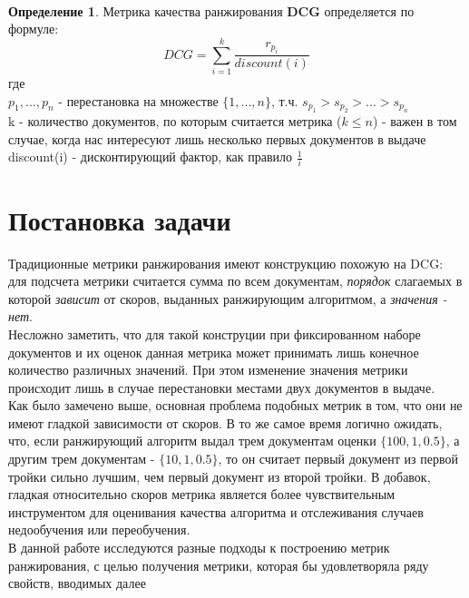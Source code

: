 \documentclass[14pt,a4paper]{amsart}
\theoremstyle{definition}
\newtheorem{definition}{Определение}[section]
\theoremstyle{definition}
\newcommand{\Sum}{\sum\limits}
\renewcommand\i{\textit}
\renewcommand\b{\textbf}
\begin{document}
~\\

\begin{definition}
Метрика качества ранжирования \b{DCG} определяется по формуле:
$$DCG = \Sum_{i=1}^k \frac{r_{p_i}}{discount(i)}$$
где \\
$p_1,...,p_n$ - перестановка на множестве $\{1,...,n\}$, т.ч. ${s_{p_1} > s_{p_2} > ... > s_{p_n}}$ \\
k - количество документов, по которым считается метрика ($k \le n$) - важен в том случае, когда нас интересуют лишь несколько первых документов в выдаче \\
discount(i) - дисконтирующий фактор, как правило $\frac{1}{i}$ \\
\end{definition}

\newpage
\section{Постановка задачи}

Традиционные метрики ранжирования имеют конструкцию похожую на DCG: для подсчета метрики считается сумма по всем документам, \i{порядок} слагаемых в которой \i{зависит} от скоров, выданных ранжирующим алгоритмом, а \i{значения - нет}.\\


Несложно заметить, что для такой конструции при фиксированном наборе документов и их оценок данная метрика может принимать лишь конечное количество различных значений. При этом изменение значения метрики происходит лишь в случае перестановки местами двух документов в выдаче.\\

Как было замечено выше, основная проблема подобных метрик в том, что они не имеют гладкой зависимости от скоров. В то же самое время логично ожидать, что, если ранжирующий алгоритм выдал трем документам оценки $\{100, 1, 0.5\}$, а другим трем документам - $\{10, 1, 0.5\}$, то он считает первый документ из первой тройки сильно лучшим, чем первый документ из второй тройки. В добавок, гладкая относительно скоров метрика является более чувствительным инструментом для оценивания качества алгоритма и отслеживания случаев недообучения или переобучения.\\

В данной работе исследуются разные подходы к построению метрик ранжирования, с целью получения метрики, которая бы удовлетворяла ряду свойств, вводимых далее\\
\end{document}
